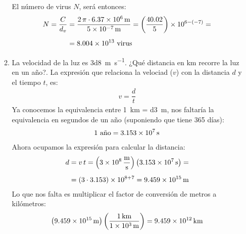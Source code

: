 \documentclass[14pt]{extarticle}
\begin{document}
\begin{enumerate}
\begin{enumerate}
El número de virus $N$, será entonces:
\begin{align*}
N = \dfrac{C}{d_{v}} &= \dfrac{2 \, \pi \cdot \SI{6.37d6}{\meter}}{\SI{5d-7}{\meter}} = \left( \dfrac{40.02}{5} \right) \times 10^{6-(-7)} = \\[0.5em]
&= \num{8.004d13} \,\, \text{virus}
\end{align*}
\item La velocidad de la luz es \SI[per-mode=symbol]{3d8}{\meter\per\second}. ¿Qué distancia en \unit{\kilo\meter} recorre la luz en un año?. La expresión que relaciona la velociad ($v$) con la distancia $d$ y el tiempo $t$, es:
\begin{align*}
v = \dfrac{d}{t}
\end{align*}
Ya conocemos la equivalencia entre \SI{1}{\kilo\meter} = \SI{d3}{\meter}, nos faltaría la equivalencia en segundos de un año (suponiendo que tiene 365 días):
\begin{align*}
1 \,\, \text{año} = \SI{3.153d7}{\second}
\end{align*}
Ahora ocupamos la expresión para calcular la distancia:
\begin{align*}
d &= v \, t = \left(\SI{3d8}{\meter\per\second} \right) \left(\SI{3.153d7}{\second} \right) = \\[0.5em]
&= (3 \cdot 3.153) \times 10^{8+7} = \SI{9.459d15}{\meter}
\end{align*}
Lo que nos falta es multiplicar el factor de conversión de metros a kilómetros:
\begin{align*}
\left(\SI{9.459d15}{\meter}\right)  \left( \dfrac{\SI{1}{\kilo\meter}}{\SI{1d3}{\meter}} \right) = \SI{9.459d12}{\kilo\meter}
\end{align*}
\end{enumerate}
\end{enumerate}
\end{document}
